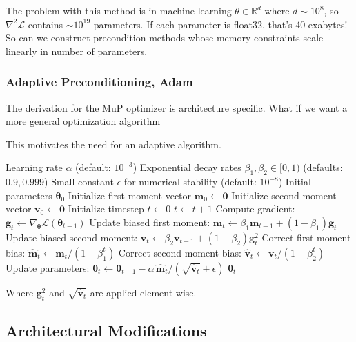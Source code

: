 The problem with this method is in machine learning $\theta \in \mathbb R^d$ where $d \sim 10^8$, so $\nabla^2 \mathcal L$ contains $\sim 10^{19}$ parameters. If each parameter is float32, that's 40 exabytes! So can we construct precondition methods whose memory constraints scale linearly in number of parameters.

\subsubsection{Adaptive Preconditioning, Adam}


The derivation for the MuP optimizer is architecture specific. What if we want a more general optimization algorithm


This motivates the need for an adaptive algorithm.
\begin{algorithm}[H]
\caption{Adam Optimizer}
\begin{algorithmic}[1]
\Require Learning rate $\alpha$ (default: $10^{-3}$)
\Require Exponential decay rates $\beta_1, \beta_2 \in [0,1)$ (defaults: $0.9, 0.999$)
\Require Small constant $\epsilon$ for numerical stability (default: $10^{-8}$)
\Require Initial parameters $\boldsymbol{\theta}_0$
\State Initialize first moment vector $\mathbf{m}_0 \gets \mathbf{0}$
\State Initialize second moment vector $\mathbf{v}_0 \gets \mathbf{0}$
\State Initialize timestep $t \gets 0$
    \State $t \gets t + 1$
    \State Compute gradient: $\mathbf{g}_t \gets \nabla_{\boldsymbol{\theta}} \mathcal{L}(\boldsymbol{\theta}_{t-1})$
    \State Update biased first moment: $\mathbf{m}_t \gets \beta_1 \mathbf{m}_{t-1} + (1-\beta_1)\mathbf{g}_t$
    \State Update biased second moment: $\mathbf{v}_t \gets \beta_2 \mathbf{v}_{t-1} + (1-\beta_2)\mathbf{g}_t^2$
    \State Correct first moment bias: $\hat{\mathbf{m}}_t \gets \mathbf{m}_t / (1 - \beta_1^t)$
    \State Correct second moment bias: $\hat{\mathbf{v}}_t \gets \mathbf{v}_t / (1 - \beta_2^t)$
    \State Update parameters: $\boldsymbol{\theta}_t \gets \boldsymbol{\theta}_{t-1} - \alpha \, \hat{\mathbf{m}}_t / (\sqrt{\hat{\mathbf{v}}_t} + \epsilon)$
\EndWhile
\State \Return $\boldsymbol{\theta}_t$
\end{algorithmic}
\end{algorithm}
Where $\mathbf g_t^2$ and $\sqrt{\hat{\mathbf{v}}_t}$ are applied element-wise.

\subsection{Architectural Modifications}
